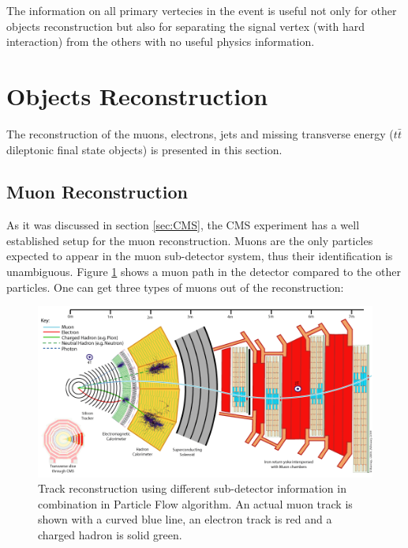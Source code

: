 The information on all primary vertecies in the event is useful not only for other objects reconstruction but also for separating the signal vertex (with hard interaction) 
from the others with no useful physics information.

\section{Objects Reconstruction}

The reconstruction of the muons, electrons, jets and missing transverse energy ($t\bar{t}$ dileptonic final state objects)
is presented in this section.

\subsection{Muon Reconstruction}

As it was discussed in section \ref{sec:CMS}, the CMS experiment has a well established setup for the muon reconstruction.
Muons are the only particles expected to appear in the muon sub-detector system, thus their identification is unambiguous.
Figure \ref{fig:PFmuons} shows a muon path in the detector compared to the other particles.
One can get three types of muons out of the reconstruction:

\begin{figure}[t]
  \centering
  \includegraphics[width=1.0\textwidth]{04_event_reconstruction/plots/CMS_Slice.png}
  \caption{Track reconstruction using different sub-detector information in combination in Particle Flow algorithm. An actual
  muon track is shown with a curved blue line, an electron track is red and a charged hadron is solid green.}
  \label{fig:PFmuons}
\end{figure}

